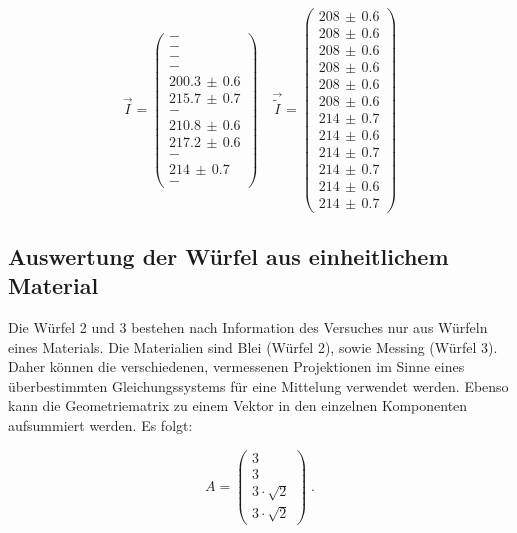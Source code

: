 \begin{equation}
	\vec{I}=
	\begin{pmatrix}
		- \\
		- \\
		- \\
		- \\
		200.3\,\pm\,0.6 \\
		215.7\,\pm\,0.7 \\
		- \\
		210.8\,\pm\,0.6 \\
		217.2\,\pm\,0.6 \\
		- \\
		214\,\pm\,0.7 \\
		-
	\end{pmatrix}
	\quad
	\vec{\tilde{I}}=
	\begin{pmatrix}
		208\,\pm\,0.6 \\
		208\,\pm\,0.6 \\
		208\,\pm\,0.6 \\
		208\,\pm\,0.6 \\
		208\,\pm\,0.6 \\
		208\,\pm\,0.6 \\
		214\,\pm\,0.7 \\
		214\,\pm\,0.6 \\
		214\,\pm\,0.7 \\
		214\,\pm\,0.7 \\
		214\,\pm\,0.6 \\
		214\,\pm\,0.7
	\end{pmatrix}
	\label{eq:int}
\end{equation}

\subsection{Auswertung der Würfel aus einheitlichem Material}

Die Würfel 2 und 3 bestehen nach Information des Versuches nur aus Würfeln 
eines Materials. Die Materialien sind Blei (Würfel 2), sowie Messing (Würfel 
3). Daher können die verschiedenen, vermessenen Projektionen im Sinne eines 
überbestimmten Gleichungssystems für eine Mittelung verwendet werden. Ebenso 
kann die Geometriematrix zu einem Vektor in den einzelnen Komponenten 
aufsummiert werden. Es folgt:

\begin{equation}
	A=
	\begin{pmatrix}
		3 \\
		3 \\
		3\cdot\sqrt{2} \\
		3\cdot\sqrt{2}
	\end{pmatrix} \; .
\end{equation}

